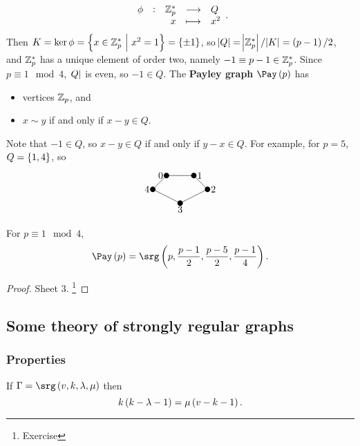 \begin{example*}
\begin{itemize}
$$ \function[\phi]{\ZZ_p^*}{Q}{x}{x^2}. $$
Then $ K = \ker \phi = \cbr{x \in \ZZ_p^* \st x^2 = 1} = \cbr{\pm 1} $, so $ \abs{Q} = \abs{\ZZ_p^*} / \abs{K} = \br{p - 1} / 2 $, and $ \mathbb{Z}_p^* $ has a unique element of order two, namely $ -1 \equiv p - 1 \in \mathbb{Z}_p^* $. Since $ p \equiv 1 \mod 4 $, $ \abs{Q} $ is even, so $ -1 \in Q $. The \textbf{Payley graph} $ \Pay\br{p} $ has
\begin{itemize}
\item vertices $ \mathbb{Z}_p $, and
\item $ x \sim y $ if and only if $ x - y \in Q $.
\end{itemize}
Note that $ -1 \in Q $, so $ x - y \in Q $ if and only if $ y - x \in Q $. For example, for $ p = 5 $, $ Q = \cbr{1, 4} $, so
$$
\begin{tikzpicture}
\fill (0, 0) circle (0.1) node[left]{$ 0 $};
\fill (1, 0) circle (0.1) node[right]{$ 1 $};
\fill (-0.5, -0.5) circle (0.1) node[left]{$ 4 $};
\fill (1.5, -0.5) circle (0.1) node[right]{$ 2 $};
\fill (0.5, -1) circle (0.1) node[below]{$ 3 $};
\draw (0, 0) to (1, 0);
\draw (0, 0) to (-0.5, -0.5);
\draw (1, 0) to (1.5, -0.5);
\draw (-0.5, -0.5) to (0.5, -1);
\draw (1.5, -0.5) to (0.5, -1);
\end{tikzpicture}
$$
\end{itemize}
\end{example*}

\begin{proposition}
For $ p \equiv 1 \mod 4 $,
$$ \Pay\br{p} = \srg\br{p, \dfrac{p - 1}{2}, \dfrac{p - 5}{2}, \dfrac{p - 1}{4}}. $$
\end{proposition}

\begin{proof}
Sheet $ 3 $. \footnote{Exercise}
\end{proof}

\pagebreak

\subsection{Some theory of strongly regular graphs}

\subsubsection{Properties}

\begin{proposition}
\label{prop:2.5}
If $ \Gamma = \srg\br{v, k, \lambda, \mu} $ then
$$ k\br{k - \lambda - 1} = \mu\br{v - k - 1}. $$
\end{proposition}

